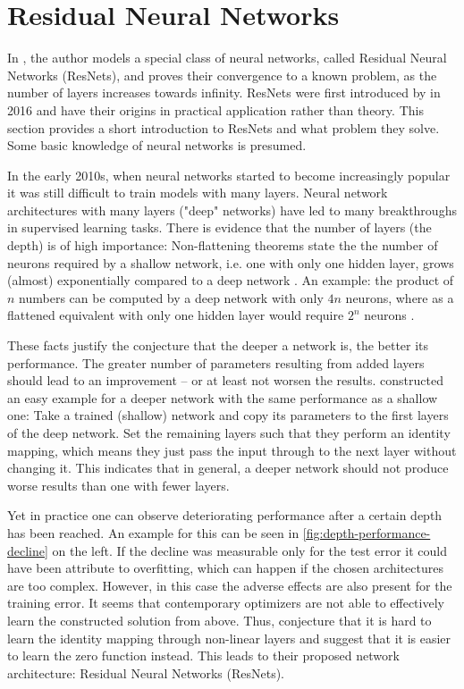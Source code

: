 \section{Residual Neural Networks}
\label{sec:neural-networks}

In \cite{owhadi20}, the author models a special class of neural networks, called Residual Neural Networks (ResNets), and proves their convergence to a known problem, as the number of layers increases towards infinity.
ResNets were first introduced by \citet{he16} in 2016 and have their origins in practical application rather than theory.
This section provides a short introduction to ResNets and what problem they solve.
Some basic knowledge of neural networks is presumed.

In the early 2010s, when neural networks started to become increasingly popular it was still difficult to train models with many layers.
Neural network architectures with many layers ("deep" networks) have led to many breakthroughs in supervised learning tasks.
There is evidence that the number of layers (the depth) is of high importance:
Non-flattening theorems state the the number of neurons required by a shallow network, i.e. one with only one hidden layer, grows (almost) exponentially compared to a deep network \cite{lin17,delalleau11}.
An example: the product of $n$ numbers can be computed by a deep network with only $4n$ neurons, where as a flattened equivalent with only one hidden layer would require $2^n$ neurons \cite{lin17}.

These facts justify the conjecture that the deeper a network is, the better its performance.
The greater number of parameters resulting from added layers should lead to an improvement --  or at least not worsen the results.
\citet{he16} constructed an easy example for a deeper network with the same performance as a shallow one:
Take a trained (shallow) network and copy its parameters to the first layers of the deep network.
Set the remaining layers such that they perform an identity mapping, which means they just pass the input through to the next layer without changing it.
This indicates that in general, a deeper network should not produce worse results than one with fewer layers.



Yet in practice one can observe deteriorating performance after a certain depth has been reached.
An example for this can be seen in \cref{fig:depth-performance-decline} on the left.
If the decline was measurable only for the test error it could have been attribute to overfitting, which can happen if the chosen architectures are too complex.
However, in this case the adverse effects are also present for the training error.
It seems that contemporary optimizers are not able to effectively learn the constructed solution from above.
Thus, \citet{he16} conjecture that it is hard to learn the identity mapping through non-linear layers and suggest that it is easier to learn the zero function instead.
This leads to their proposed network architecture: Residual Neural Networks (ResNets).

